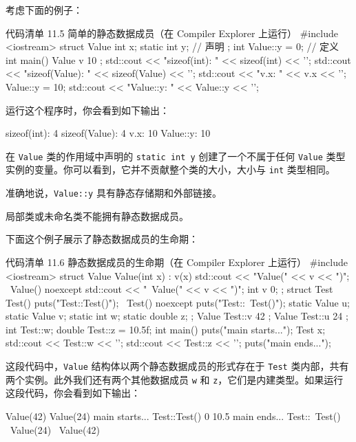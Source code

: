 考虑下面的例子：

\begin{codeboxt}[cpp]{代码清单 11.5 简单的静态数据成员（在 Compiler Explorer 上运行）}
#include <iostream>
struct Value {
int x;
static int y; // 声明
};
int Value::y = 0; // 定义
int main() {
Value v { 10 };
std::cout << "sizeof(int): " << sizeof(int) << '\n';
std::cout << "sizeof(Value): " << sizeof(Value) << '\n';
std::cout << "v.x: " << v.x << '\n';
Value::y = 10;
std::cout << "Value::y: " << Value::y << '\n';
}
\end{codeboxt}

运行这个程序时，你会看到如下输出：

\begin{codebox}[cpp]
sizeof(int): 4
sizeof(Value): 4
v.x: 10
Value::y: 10
\end{codebox}

在 \texttt{Value} 类的作用域中声明的 \texttt{static int y} 创建了一个不属于任何 \texttt{Value} 类型实例的变量。你可以看到，它并不贡献整个类的大小，大小与 \texttt{int} 类型相同。

准确地说，\texttt{Value::y} 具有静态存储期和外部链接。

\begin{myWarnBox}
局部类或未命名类不能拥有静态数据成员。
\end{myWarnBox}

下面这个例子展示了静态数据成员的生命期：

\begin{codeboxt}[cpp]{代码清单 11.6 静态数据成员的生命期（在 Compiler Explorer 上运行）}
#include <iostream>
struct Value {
Value(int x) : v(x) { std::cout << "Value(" << v << ")\n"; }
~Value() noexcept { std::cout << "~Value(" << v << ")\n"; }
int v {0};
};
struct Test {
Test() { puts("Test::Test()"); }
~Test() noexcept { puts("Test::~Test()"); }
static Value u;
static Value v;
static int w;
static double z;
};
Value Test::v { 42 };
Value Test::u { 24 };
int Test::w;
double Test::z = 10.5f;
int main() {
puts("main starts...");
Test x;
std::cout << Test::w << '\n';
std::cout << Test::z << '\n';
puts("main ends...");
}
\end{codeboxt}


这段代码中，\texttt{Value} 结构体以两个静态数据成员的形式存在于 \texttt{Test} 类内部，共有两个实例。此外我们还有两个其他数据成员 \texttt{w} 和 \texttt{z}，它们是内建类型。如果运行这段代码，你会看到如下输出：

\begin{codebox}[cpp]
Value(42)
Value(24)
main starts...
Test::Test()
0
10.5
main ends...
Test::~Test()
~Value(24)
~Value(42)
\end{codebox}

